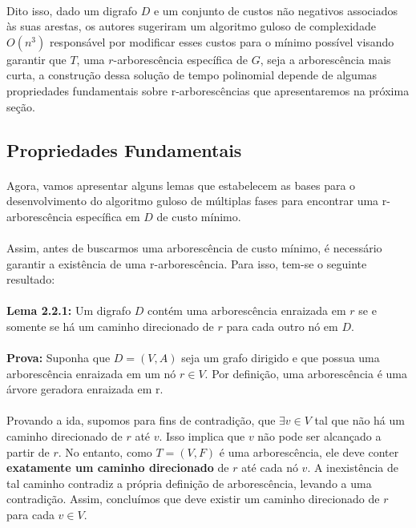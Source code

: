 \documentclass[12pt,a4paper]{article}
\begin{document}
\paragraph{}
Dito isso, dado um digrafo \( D \) e um conjunto de custos não negativos associados às suas arestas, os autores sugeriram um algoritmo guloso de complexidade \( O(n^3)\) responsável por modificar esses custos para o mínimo possível visando garantir que \( T \), uma \( r \)-arborescência específica de \( G \), seja a arborescência mais curta, a construção dessa solução de tempo polinomial depende de algumas propriedades fundamentais sobre r-arborescências que apresentaremos na próxima seção.

\subsection{Propriedades Fundamentais}
\paragraph{}
Agora, vamos apresentar alguns lemas que estabelecem as bases para o desenvolvimento do algoritmo guloso de múltiplas fases para encontrar uma r-arborescência específica em \(D \) de custo mínimo.

\paragraph{}
Assim, antes de buscarmos uma arborescência de custo mínimo, é necessário garantir a existência de uma r-arborescência. Para isso, tem-se o seguinte resultado:

\paragraph{}
\textbf{Lema 2.2.1:} Um digrafo \(D\) contém uma arborescência enraizada em \(r\) se e somente se há um caminho direcionado de \(r\) para cada outro nó em \(D\).

\paragraph{}
\textbf{Prova:} Suponha que \(D = (V, A)\) seja um grafo dirigido e que possua uma arborescência enraizada em um nó \(r \in V\). Por definição, uma arborescência é uma árvore geradora enraizada em r.

\paragraph{}
Provando a ida, supomos para fins de contradição, que \(\exists v \in V\) tal que não há um caminho direcionado de \(r\) até \(v\). Isso implica que \(v\) não pode ser alcançado a partir de \(r\). No entanto, como \(T = (V, F)\) é uma arborescência, ele deve conter \textbf{exatamente um caminho direcionado} de \(r\) até cada nó \(v\). A inexistência de tal caminho contradiz a própria definição de arborescência, levando a uma contradição. Assim, concluímos que deve existir um caminho direcionado de \(r\) para cada \(v \in V\).
\end{document}
